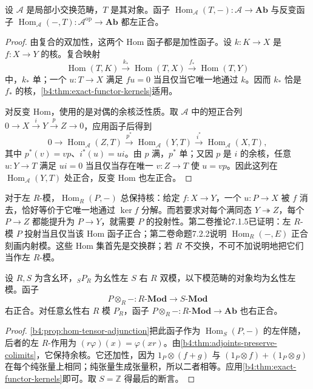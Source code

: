 \begin{proposition}\label{b4:prop:hom-left-exact}
	设 \(\mathcal A\) 是局部小交换范畴，\(T\) 是其对象。函子 \(\operatorname{Hom}_{\mathcal A}(T,-):\mathcal A\to\mathbf{Ab}\) 与反变函子 \(\operatorname{Hom}_{\mathcal A}(-,T):\mathcal A^{\mathrm{op}}\to\mathbf{Ab}\) 都左正合。
\end{proposition}
\begin{proof}
	由复合的双加性，这两个 Hom 函子都是加性函子。设 \(k:K\to X\) 是 \(f:X\to Y\) 的核。复合映射
	\[
		\operatorname{Hom}(T,K)\xrightarrow{k_*}\operatorname{Hom}(T,X) \xrightarrow{f_*}\operatorname{Hom}(T,Y)
	\]
	中，\(k_*\) 单；一个 \(u:T\to X\) 满足 \(fu=0\) 当且仅当它唯一地通过 \(k\)。因而 \(k_*\) 恰是 \(f_*\) 的核，\cref{b4:thm:exact-functor-kernels}适用。

	对反变 Hom，使用的是对偶的余核泛性质。取 \(\mathcal A\) 中的短正合列 \(0\to X\xrightarrow iY\xrightarrow pZ\to0\)，应用函子后得到
	\[
		0\longrightarrow\operatorname{Hom}_{\mathcal A}(Z,T) \xrightarrow{p^*}\operatorname{Hom}_{\mathcal A}(Y,T) \xrightarrow{i^*}\operatorname{Hom}_{\mathcal A}(X,T),
	\]
	其中 \(p^*(v)=vp\)、\(i^*(u)=ui\)。由 \(p\) 满，\(p^*\) 单；又因 \(p\) 是 \(i\) 的余核，任意 \(u:Y\to T\) 满足 \(ui=0\) 当且仅当存在唯一 \(v:Z\to T\) 使 \(u=vp\)。因此这列在 \(\operatorname{Hom}_{\mathcal A}(Y,T)\) 处正合，反变 Hom 也左正合。
\end{proof}

对于左 \(R\)-模，\(\operatorname{Hom}_R(P,-)\) 总保持核：给定 \(f:X\to Y\)，一个 \(u:P\to X\) 被 \(f\) 消去，恰好等价于它唯一地通过 \(\ker f\) 分解。而若要求对每个满同态 \(Y\twoheadrightarrow Z\)，每个 \(P\to Z\) 都能提升为 \(P\to Y\)，就需要 \(P\) 的投射性。第二卷推论7.1.5已证明：左 \(R\)-模 \(P\) 投射当且仅当该 Hom 函子正合；第二卷命题7.2.2说明 \(\operatorname{Hom}_R(-,E)\) 正合刻画内射模。这些 Hom 集首先是交换群；若 \(R\) 不交换，不可不加说明地把它们当作左 \(R\)-模。

\begin{proposition}\label{b4:prop:tensor-right-exact}
	设 \(R,S\) 为含幺环，\({}_SP_R\) 为幺性左 \(S\) 右 \(R\) 双模，以下模范畴的对象均为幺性左模。函子
	\[
		P\otimes_R-:R\text{-}\mathbf{Mod}\longrightarrow S\text{-}\mathbf{Mod}
	\]
	右正合。对任意幺性右 \(R\) 模 \(P_R\)，函子 \(P\otimes_R-:R\text{-}\mathbf{Mod}\to\mathbf{Ab}\) 也右正合。
\end{proposition}
\begin{proof}
	\cref{b4:prop:hom-tensor-adjunction}把此函子作为 \(\operatorname{Hom}_S(P,-)\) 的左伴随，后者的左 \(R\)-作用为 \((r\varphi)(x)=\varphi(xr)\)。由\cref{b4:thm:adjoints-preserve-colimits}，它保持余核。它还加性，因为 \(1_P\otimes(f+g)\) 与 \((1_P\otimes f)+(1_P\otimes g)\) 在每个纯张量上相同；纯张量生成张量积，所以二者相等。应用\cref{b4:thm:exact-functor-kernels}即可。取 \(S=\mathbb Z\) 得最后的断言。
\end{proof}

